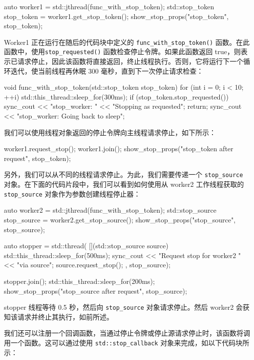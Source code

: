 \begin{cpp}
auto worker1 = std::jthread(func_with_stop_token);
std::stop_token stop_token = worker1.get_stop_token();
show_stop_props("stop_token", stop_token);
\end{cpp}

Worker1 正在运行在随后的代码块中定义的 \verb|func_with_stop_token()| 函数。在此函数中，使用\verb|stop_requested()| 函数检查停止令牌。如果此函数返回 true，则表示已请求停止，因此该函数将直接返回，终止线程执行。否则，它将运行下一个循环迭代，使当前线程再休眠 300 毫秒，直到下一次停止请求检查：

\begin{cpp}
void func_with_stop_token(std::stop_token stop_token) {
    for (int i = 0; i < 10; ++i) {
        std::this_thread::sleep_for(300ms);
        if (stop_token.stop_requested()) {
            sync_cout << "stop_worker: "
            << "Stopping as requested\n";
            return;
        }
        sync_cout << "stop_worker: Going back to sleep\n";
    }
}
\end{cpp}

我们可以使用线程对象返回的停止令牌向主线程请求停止，如下所示：

\begin{cpp}
worker1.request_stop();
worker1.join();
show_stop_props("stop_token after request", stop_token);
\end{cpp}

另外，我们可以从不同的线程请求停止。为此，我们需要传递一个 \verb|stop_source| 对象。在下面的代码片段中，我们可以看到如何使用从 worker2 工作线程获取的 \verb|stop_source| 对象作为参数创建线程停止器：

\begin{cpp}
auto worker2 = std::jthread(func_with_stop_token);
std::stop_source stop_source = worker2.get_stop_source();
show_stop_props("stop_source", stop_source);

auto stopper = std::thread( [](std::stop_source source) {
        std::this_thread::sleep_for(500ms);
        sync_cout << "Request stop for worker2 "
                  << "via source\n";
        source.request_stop();
    }, stop_source);

stopper.join();
std::this_thread::sleep_for(200ms);
show_stop_props("stop_source after request", stop_source);
\end{cpp}

stopper 线程等待 0.5 秒，然后向 \verb|stop_source| 对象请求停止。然后 worker2 会获知该请求并终止其执行，如前所述。

我们还可以注册一个回调函数，当通过停止令牌或停止源请求停止时，该函数将调用一个函数。这可以通过使用 \verb|std::stop_callback| 对象来完成，如以下代码块所示：

